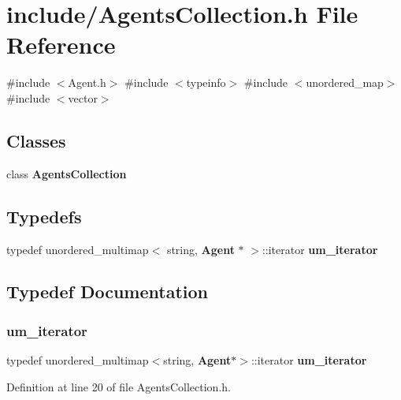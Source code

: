 \section{include/\+Agents\+Collection.h File Reference}
\label{_agents_collection_8h}
{\ttfamily \#include $<$Agent.\+h$>$}\newline
{\ttfamily \#include $<$typeinfo$>$}\newline
{\ttfamily \#include $<$unordered\+\_\+map$>$}\newline
{\ttfamily \#include $<$vector$>$}\newline
\subsection*{Classes}
\begin{DoxyCompactItemize}
\item 
class \textbf{ Agents\+Collection}
\end{DoxyCompactItemize}
\subsection*{Typedefs}
\begin{DoxyCompactItemize}
\item 
typedef unordered\+\_\+multimap$<$ string, \textbf{ Agent} $\ast$ $>$\+::iterator \textbf{ um\+\_\+iterator}
\end{DoxyCompactItemize}


\subsection{Typedef Documentation}
\mbox{\label{_agents_collection_8h_afde47bc45d604b8b8c72755072376679}} 
\subsubsection{um\_iterator}
{\footnotesize\ttfamily typedef unordered\+\_\+multimap$<$string, \textbf{ Agent}$\ast$$>$\+::iterator \textbf{ um\+\_\+iterator}}



Definition at line 20 of file Agents\+Collection.\+h.

